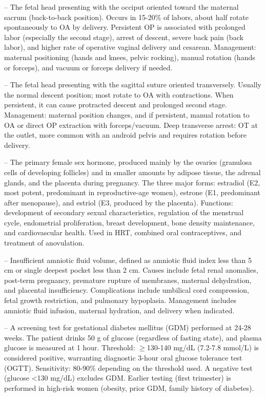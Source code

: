 -- The fetal head presenting with the occiput oriented toward the maternal sacrum (back-to-back position). Occurs in 15-20\% of labors, about half rotate spontaneously to OA by delivery. Persistent OP is associated with prolonged labor (especially the second stage), arrest of descent, severe back pain (back labor), and higher rate of operative vaginal delivery and cesarean. Management: maternal positioning (hands and knees, pelvic rocking), manual rotation (hands or forceps), and vacuum or forceps delivery if needed.

-- The fetal head presenting with the sagittal suture oriented transversely. Usually the normal descent position; most rotate to OA with contractions. When persistent, it can cause protracted descent and prolonged second stage. Management: maternal position changes, and if persistent, manual rotation to OA or direct OP extraction with forceps/vacuum. Deep transverse arrest: OT at the outlet, more common with an android pelvis and requires rotation before delivery.

-- The primary female sex hormone, produced mainly by the ovaries (granulosa cells of developing follicles) and in smaller amounts by adipose tissue, the adrenal glands, and the placenta during pregnancy. The three major forms: estradiol (E2, most potent, predominant in reproductive-age women), estrone (E1, predominant after menopause), and estriol (E3, produced by the placenta). Functions: development of secondary sexual characteristics, regulation of the menstrual cycle, endometrial proliferation, breast development, bone density maintenance, and cardiovascular health. Used in HRT, combined oral contraceptives, and treatment of anovulation.

-- Insufficient amniotic fluid volume, defined as amniotic fluid index less than 5 cm or single deepest pocket less than 2 cm. Causes include fetal renal anomalies, post-term pregnancy, premature rupture of membranes, maternal dehydration, and placental insufficiency. Complications include umbilical cord compression, fetal growth restriction, and pulmonary hypoplasia. Management includes amniotic fluid infusion, maternal hydration, and delivery when indicated.

-- A screening test for gestational diabetes mellitus (GDM) performed at 24-28 weeks. The patient drinks 50 g of glucose (regardless of fasting state), and plasma glucose is measured at 1 hour. Threshold: \(\ge\)130-140 mg/dL (7.2-7.8 mmol/L) is considered positive, warranting diagnostic 3-hour oral glucose tolerance test (OGTT). Sensitivity: 80-90\% depending on the threshold used. A negative test (glucose <130 mg/dL) excludes GDM. Earlier testing (first trimester) is performed in high-risk women (obesity, prior GDM, family history of diabetes).

